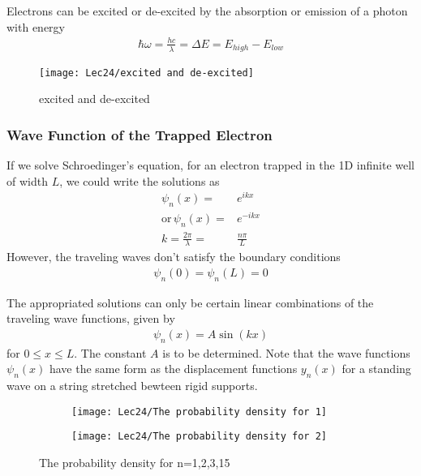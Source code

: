 Electrons can be excited or de-excited by the absorption or emission of a photon with energy
\begin{align*}
    \hbar\omega=\frac{hc}{\lambda}=\Delta E=E_{high}-E_{low}
\end{align*}

\begin{figure}[H]
    \centering
    \texttt{[image: Lec24/excited and de-excited]}
    \caption{excited and de-excited}
\end{figure}

\subsubsection{Wave Function of the Trapped Electron}
If we solve Schroedinger's equation, for an electron trapped in the 1D infinite well of width $L$, we could write the solutions as 
\begin{align*}
    \psi_n(x)=&e^{ikx} \\
    \text{or}\,\psi_n(x)=&e^{-ikx}\\
    k=\frac{2\pi}{\lambda}=&\frac{n\pi}{L}
\end{align*}
However, the traveling waves don't satisfy the boundary conditions
\begin{align*}
    \psi_n(0)=\psi_n(L)=0
\end{align*}

The appropriated solutions can only be certain linear combinations of the traveling wave functions, given by 
\begin{align*}
    \psi_n(x)=A\sin(kx)
\end{align*}
for $0\le x\le L$. The constant $A$ is to be determined. Note that the wave functions $\psi_n(x)$ have the same form as the displacement functions $y_n(x)$ for a standing  wave on a string stretched bewteen rigid supports. 

\begin{figure}[H]
    \centering
    \begin{subfigure}{0.22\textwidth}
        \centering
        \texttt{[image: Lec24/The probability density for 1]}
    \end{subfigure}
    \begin{subfigure}{0.22\textwidth}
        \centering
        \texttt{[image: Lec24/The probability density for 2]}
    \end{subfigure}
    \caption{The probability density for n=1,2,3,15}
\end{figure}

